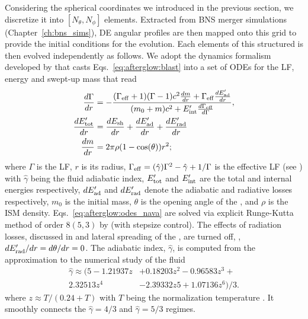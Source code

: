 Considering the spherical coordinates we introduced in the previous section, 
we discretize it into $[N_{\theta},N_{\phi}]$ elements.
%
Extracted from \ac{BNS} merger simulations (Chapter~\ref{ch:bns_sims}), 
\ac{DE} angular profiles are then mapped onto this grid to provide the 
initial conditions for the evolution. 
%
Each elements of this structured \blast{} is then evolved independently 
as follows. 
%
We adopt the \blast{} dynamics formalism developed by \citet{Nava:2013} that casts 
Eqs.~\eqref{eq:afterglow:blast} into a set of \acp{ODE} for the \blast{} \ac{LF}, 
energy and swept-up mass that read 
%
\begin{subequations}
    \label{eq:afterglow:odes_nava}
    \begin{align}
    \frac{d\Gamma}{dr} &= -\frac{(\Gamma_{\rm eff} + 1)(\Gamma - 1) c^2\frac{dm}{dr} + \Gamma_{\rm eff}\frac{dE'_{\rm ad}}{dr}}{(m_0 + m) c^2 + E'_{\rm int}\frac{d\Gamma_{\rm eff}\rm }{d\Gamma}}, \\
    \frac{dE'_{\rm tot}}{dr} &= \frac{dE_{\rm sh}}{dr} + \frac{dE'_{\rm ad}}{dr} + \frac{dE'_{\rm rad}}{dr} \\
    \frac{dm}{dr} &= 2 \pi \rho (1 - \cos(\theta)) r^2;
    \end{align}
\end{subequations}
%
where $\Gamma$ is the \blast{} \ac{LF}, $r$ is its radius, 
$\Gamma_{\rm eff} = (\hat{\gamma})\Gamma^2-\hat{\gamma}+1 / \Gamma$ is the effective 
\ac{LF} (see \citet{Nava:2013}) 
with $\hat{\gamma}$ being the fluid adiabatic index, 
$E'_{\rm tot}$ and  $E'_{\rm int}$ are the total and internal energies respectively, 
$dE'_{\rm ad}$ and $dE'_{\rm rad}$ denote the adiabatic and radiative losses respectively, 
$m_0$ is the initial mass, 
$\theta$ is the opening angle of the \blast{}, 
and $\rho$ is the \ac{ISM} density.
%
Eqs.~\ref{eq:afterglow:odes_nava} are solved via 
explicit Runge-Kutta method of order $8(5,3)$ by \citet{Dormand:1980} 
(with stepsize control). 
%
The effects of radiation losses, discussed in \citet{Nava:2013} and lateral 
spreading of the \blast{} \citep[\eg][]{Granot:2012}, are turned off,
\ie, $d E'_{\rm rad}/dr = d\theta / dr = 0$.
%
The adiabatic index, $\hat{\gamma}$, is computed from the approximation to the 
numerical study of the \trans{} fluid \citep{Service:1986}
%
\begin{eqnarray}
\hat{\gamma} \approx (5 - 1.21937z &+ 0.18203z^2 - 0.96583z^3 + \\
2.32513z^4 &- 2.39332z 5 + 1.07136z^6)/3.
\end{eqnarray}
% 
where $z \approx T/(0.24 + T)$ with $T$ being the normalization temperature
\citep{Peer:2012}.
%
It smoothly connects the 
$\hat{\gamma}=4/3$ and $\hat{\gamma}=5/3$ regimes. 


